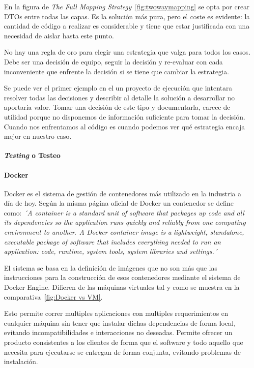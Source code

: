 En la figura de \textit{The Full Mapping Strategy}~\cref{fig:twowaymapping} se opta por crear DTOs entre todas las capas.
Es la solución más pura, pero el coste es evidente: la cantidad de código a realizar es considerable y tiene que estar justificada con una necesidad de aislar hasta este punto.

No hay una regla de oro para elegir una estrategia que valga para todos los casos.
Debe ser una decisión de equipo, seguir la decisión y re-evaluar con cada inconveniente que enfrente la decisión si se tiene que cambiar la estrategia.

Se puede ver el primer ejemplo en el un proyecto de ejecución que intentara resolver todas las decisiones y describir al detalle la solución a desarrollar no aportaría valor.
Tomar una decisión de este tipo y documentarla, carece de utilidad porque no disponemos de información suficiente para tomar la decisión.
Cuando nos enfrentamos al código es cuando podemos ver qué estrategia encaja mejor en nuestro caso.

\paragraph{\textit{Testing} o Testeo}
    

\paragraph{Docker}

Docker es el sistema de gestión de contenedores más utilizado en la industria a día de hoy.
Según la misma página oficial de Docker un contenedor se define como: \textit{´A container is a standard unit of software that packages up code and all its dependencies so the application runs quickly and reliably from one computing environment to another.
A Docker container image is a lightweight, standalone, executable package of software that includes everything needed to run an application: code, runtime, system tools, system libraries and settings.´}~\cite{docker}

El sistema se basa en la definición de imágenes que no son más que las instrucciones para la construcción de esos contenedores mediante el sistema de Docker Engine.
Difieren de las máquinas virtuales tal y como se muestra en la comparativa~\cref{fig:Docker vs VM}.

Esto permite correr multiples aplicaciones con multiples requerimientos en cualquier máquina sin tener que instalar dichas dependencias de forma local, evitando incompatibilidades e interacciones no deseadas.
Permite ofrecer un producto consistentes a los clientes de forma que el software y todo aquello que necesita para ejecutarse se entregan de forma conjunta, evitando problemas de instalación.


